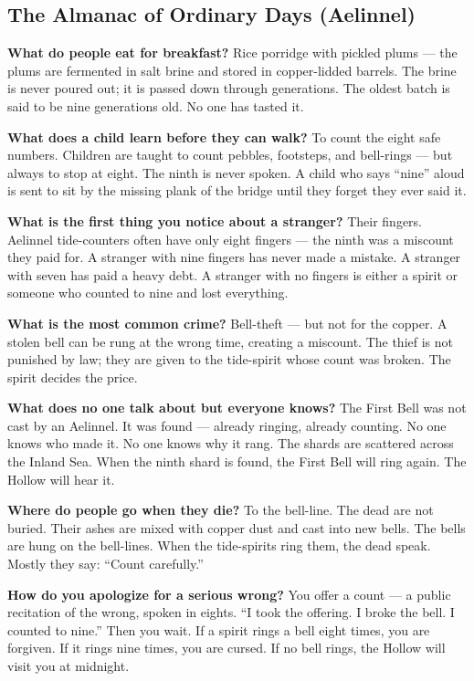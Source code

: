 \subsection*{The Almanac of Ordinary Days (Aelinnel)}
\begin{almanac}
\textbf{What do people eat for breakfast?} Rice porridge with pickled plums --- the plums are fermented in salt brine and stored in copper-lidded barrels. The brine is never poured out; it is passed down through generations. The oldest batch is said to be nine generations old. No one has tasted it.

\textbf{What does a child learn before they can walk?} To count the eight safe numbers. Children are taught to count pebbles, footsteps, and bell-rings --- but always to stop at eight. The ninth is never spoken. A child who says ``nine'' aloud is sent to sit by the missing plank of the bridge until they forget they ever said it.

\textbf{What is the first thing you notice about a stranger?} Their fingers. Aelinnel tide-counters often have only eight fingers --- the ninth was a miscount they paid for. A stranger with nine fingers has never made a mistake. A stranger with seven has paid a heavy debt. A stranger with no fingers is either a spirit or someone who counted to nine and lost everything.

\textbf{What is the most common crime?} Bell-theft --- but not for the copper. A stolen bell can be rung at the wrong time, creating a miscount. The thief is not punished by law; they are given to the tide-spirit whose count was broken. The spirit decides the price.

\textbf{What does no one talk about but everyone knows?} The First Bell was not cast by an Aelinnel. It was found --- already ringing, already counting. No one knows who made it. No one knows why it rang. The shards are scattered across the Inland Sea. When the ninth shard is found, the First Bell will ring again. The Hollow will hear it.

\textbf{Where do people go when they die?} To the bell-line. The dead are not buried. Their ashes are mixed with copper dust and cast into new bells. The bells are hung on the bell-lines. When the tide-spirits ring them, the dead speak. Mostly they say: ``Count carefully.''

\textbf{How do you apologize for a serious wrong?} You offer a count --- a public recitation of the wrong, spoken in eights. ``I took the offering. I broke the bell. I counted to nine.'' Then you wait. If a spirit rings a bell eight times, you are forgiven. If it rings nine times, you are cursed. If no bell rings, the Hollow will visit you at midnight.


\end{almanac}
